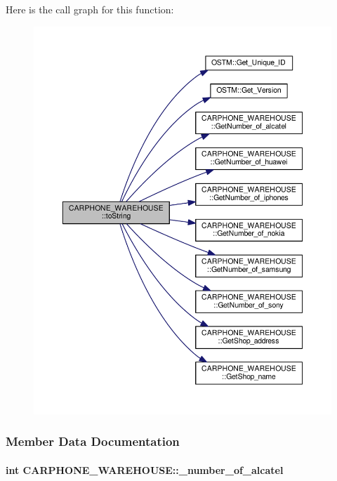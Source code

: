 Here is the call graph for this function\+:\nopagebreak
\begin{figure}[H]
\begin{center}
\leavevmode
\includegraphics[width=350pt]{class_c_a_r_p_h_o_n_e___w_a_r_e_h_o_u_s_e_a4d96bb512ffcd1e0b13f632cb7fd242b_a4d96bb512ffcd1e0b13f632cb7fd242b_cgraph}
\end{center}
\end{figure}




\subsubsection{Member Data Documentation}
\paragraph[{\texorpdfstring{\+\_\+number\+\_\+of\+\_\+alcatel}{_number_of_alcatel}}]{\setlength{\rightskip}{0pt plus 5cm}int C\+A\+R\+P\+H\+O\+N\+E\+\_\+\+W\+A\+R\+E\+H\+O\+U\+S\+E\+::\+\_\+number\+\_\+of\+\_\+alcatel\hspace{0.3cm}{\ttfamily [private]}}\hypertarget{class_c_a_r_p_h_o_n_e___w_a_r_e_h_o_u_s_e_a7e089af48a2a409a8d348d81f65d9193_a7e089af48a2a409a8d348d81f65d9193}{}\label{class_c_a_r_p_h_o_n_e___w_a_r_e_h_o_u_s_e_a7e089af48a2a409a8d348d81f65d9193_a7e089af48a2a409a8d348d81f65d9193}


